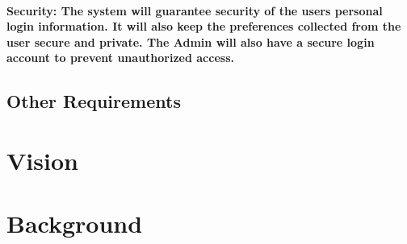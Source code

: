 \documentclass{article}
\begin{document}
		\paragraph{Security: The system will guarantee security of the users personal login information. It will also keep the preferences collected from the user secure and private. The Admin will also have a secure login account to prevent unauthorized access.}
        \subsection{Other Requirements}
	
	\section{Vision}


	\section{Background}
	
\end{document}
